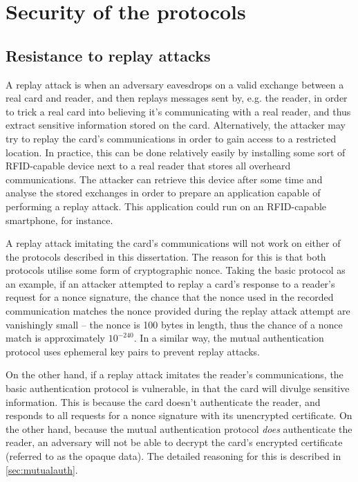 \documentclass[12pt,a4paper,twoside,openright]{report}
\begin{document}
\section{Security of the protocols}

\subsection{Resistance to replay attacks}

A replay attack is when an adversary eavesdrops on a valid exchange between a real card and reader, and then replays messages sent by, e.g. the reader, in order to trick a real card into believing it's communicating with a real reader, and thus extract sensitive information stored on the card. Alternatively, the attacker may try to replay the card's communications in order to gain access to a restricted location. In practice, this can be done relatively easily by installing some sort of RFID-capable device next to a real reader that stores all overheard communications. The attacker can retrieve this device after some time and analyse the stored exchanges in order to prepare an application capable of performing a replay attack. This application could run on an RFID-capable smartphone, for instance.

A replay attack imitating the card's communications will not work on either of the protocols described in this dissertation. The reason for this is that both protocols utilise some form of cryptographic nonce. Taking the basic protocol as an example, if an attacker attempted to replay a card's response to a reader's request for a nonce signature, the chance that the nonce used in the recorded communication matches the nonce provided during the replay attack attempt are vanishingly small -- the nonce is 100 bytes in length, thus the chance of a nonce match is approximately $10^{-240}$. In a similar way, the mutual authentication protocol uses ephemeral key pairs to prevent replay attacks.

On the other hand, if a replay attack imitates the reader's communications, the basic authentication protocol is vulnerable, in that the card will divulge sensitive information. This is because the card doesn't authenticate the reader, and responds to all requests for a nonce signature with its unencrypted certificate. On the other hand, because the mutual authentication protocol \emph{does} authenticate the reader, an adversary will not be able to decrypt the card's encrypted certificate (referred to as the opaque data). The detailed reasoning for this is described in \autoref{sec:mutualauth}.
\end{document}
